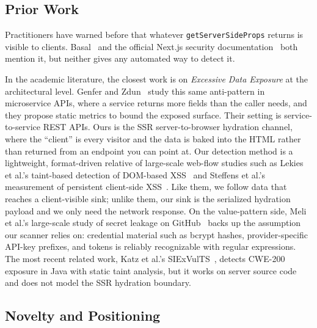 \documentclass[runningheads]{llncs}
\begin{document}
\subsection{Prior Work}

Practitioners have warned before that whatever
\texttt{getServerSideProps} returns is visible to clients.
Basal~\cite{basal2022} and the official Next.js security
documentation~\cite{next_security} both mention it, but neither gives any
automated way to detect it.

In the academic literature, the closest work is on \emph{Excessive Data
Exposure} at the architectural level.  Genfer and Zdun~\cite{genfer2022}
study this same anti-pattern in microservice APIs, where a service returns
more fields than the caller needs, and they propose static metrics to
bound the exposed surface.  Their setting is service-to-service REST APIs.
Ours is the SSR server-to-browser hydration channel, where the ``client''
is every visitor and the data is baked into the HTML rather than returned
from an endpoint you can point at.  Our detection method is a lightweight,
format-driven relative of large-scale web-flow studies such as Lekies et
al.'s taint-based detection of DOM-based XSS~\cite{lekies2013} and Steffens
et al.'s measurement of persistent client-side XSS~\cite{steffens2019}.
Like them, we follow data that reaches a client-visible sink; unlike them,
our sink is the serialized hydration payload and we only need the network
response.  On the value-pattern side, Meli et al.'s large-scale study of
secret leakage on GitHub~\cite{meli2019} backs up the assumption our
scanner relies on: credential material such as bcrypt hashes,
provider-specific API-key prefixes, and tokens is reliably recognizable
with regular expressions.  The most recent related work, Katz et al.'s
SIExVulTS~\cite{siexvults2025}, detects CWE-200 exposure in Java with
static taint analysis, but it works on server source code and does not
model the SSR hydration boundary.

\subsection{Novelty and Positioning}
\end{document}
